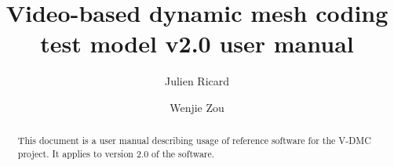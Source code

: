 \documentclass[a4paper,11pt]{mpegdoc}
\title{Video-based dynamic mesh coding test model v2.0 user manual}
\author{%
  Julien Ricard	\email{julien.ricard@interdital.com}  
\and
  Wenjie Zou \email{wjzou@xidian.edu.cn} 
}
\begin{document}
\maketitle
\begin{abstract}
This document is a user manual describing usage of reference software
for the V-DMC project. It applies to version 2.0 of the software.
\end{abstract}
\newpage

\tableofcontents

\newpage









 



%
\end{document}
